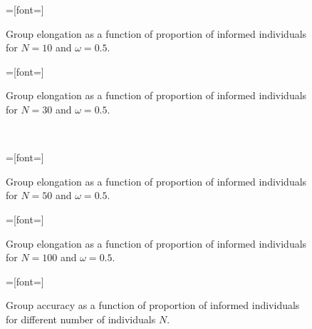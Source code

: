 
\setlength{}
\setlength{}

\begin{figure}[H]
{}=[font=\scriptsize]

\caption{Group elongation as a function of proportion of informed individuals for $N=10$ and $\omega = 0.5$.}
\label{fig:elong10}
\end{figure}

\begin{figure}[H]
{}=[font=\scriptsize]

\caption{Group elongation as a function of proportion of informed individuals for $N=30$ and $\omega = 0.5$.}
\label{fig:elong30}
\end{figure}
\vfill
\newpage
\ \\
\begin{figure}[H]
{}=[font=\scriptsize]

\caption{Group elongation as a function of proportion of informed individuals for $N=50$ and $\omega = 0.5$.}
\label{fig:elong50}
\end{figure}

\begin{figure}[H]
{}=[font=\scriptsize]

\caption{Group elongation as a function of proportion of informed individuals for $N=100$ and $\omega = 0.5$.}
\label{fig:elong100}
\end{figure}
\vfill
\newpage

\begin{figure}[H]
{}=[font=\scriptsize]

\caption{Group accuracy as a function of proportion of informed individuals for different number of individuals $N$.}
\label{fig:accuracy}
\end{figure}